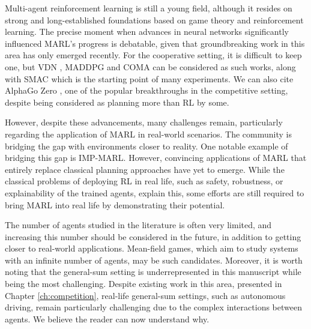 Multi-agent reinforcement learning is still a young field, although it resides on strong and long-established foundations based on game theory and reinforcement learning.
The precise moment when advances in neural networks significantly influenced MARL's progress is debatable, given that groundbreaking work in this area has only emerged recently.
For the cooperative setting, it is difficult to keep one, but VDN \citep{sunehag2018vdn}, MADDPG \cite{lowe2017multi} and COMA \citep{foerster2017coma} can be considered as such works, along with SMAC \citep{samvelyan2019starcraft} which is the starting point of many experiments.
We can also cite AlphaGo Zero \citep{silver2017mastering}, one of the popular breakthroughs in the competitive setting, despite being considered as planning more than RL by some.

However, despite these advancements, many challenges remain, particularly regarding the application of MARL in real-world scenarios.
The community is bridging the gap with environments closer to reality.
One notable example of bridging this gap is IMP-MARL.
However, convincing applications of MARL that entirely replace classical planning approaches have yet to emerge.
While the classical problems of deploying RL in real life, such as safety, robustness, or explainability of the trained agents, explain this, some efforts are still required to bring MARL into real life by demonstrating their potential.

The number of agents studied in the literature is often very limited, and increasing this number should be considered in the future, in addition to getting closer to real-world applications.
Mean-field games, which aim to study systems with an infinite number of agents, may be such candidates.
Moreover, it is worth noting that the general-sum setting is underrepresented in this manuscript while being the most challenging.
Despite existing work in this area, presented in Chapter \ref{ch:competition}, real-life general-sum settings, such as autonomous driving, remain particularly challenging due to the complex interactions between agents.
We believe the reader can now understand why.

